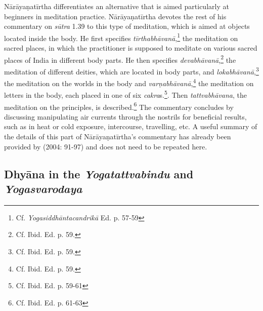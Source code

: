 Nārāyaṇatīrtha differentiates an alternative that is aimed particularly at beginners in meditation practice. Nārāyaṇatīrtha devotes the rest of his commentary on \textit{sūtra} 1.39 to this type of meditation, which is aimed at objects located inside the body. He first specifies \textit{tīrthabhāvanā},\footnote{Cf. \emph{Yogasiddhāntacandrikā} Ed. p. 57-59} the meditation on sacred places, in which the practitioner is supposed to meditate on various sacred places of India in different body parts. He then specifies \textit{devabhāvanā},\footnote{Cf. Ibid. Ed. p. 59.} the meditation of different deities, which are located in body parts, and \textit{lokabhāvanā},\footnote{Cf. Ibid. Ed. p. 59.} the meditation on the worlds in the body and \textit{varṇabhāvanā},\footnote{Cf. Ibid. Ed. p. 59.} the meditation on letters in the body, each placed in one of six \textit{cakra}s.\footnote{Cf. Ibid. Ed. p. 59-61}. Then \textit{tattvabhāvana}, the meditation on the principles, is described.\footnote{Cf. Ibid. Ed. p. 61-63} The commentary concludes by discussing manipulating air currents through the nostrils for beneficial results, such as in heat or cold exposure, intercourse, travelling, etc. A useful summary of the details of this part of Nārāyaṇatīrtha's commentary has already been provided by \citeauthor{penna2004} (2004: 91-97) and does not need to be repeated here.

\subsection{Dhyāna in the \textit{Yogatattvabindu} and \textit{Yogasvarodaya}}

